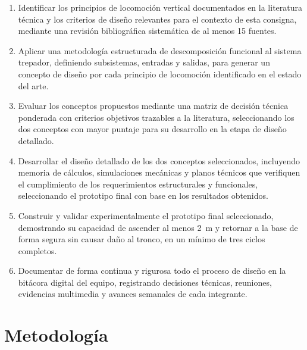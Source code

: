 \documentclass[lettersize,journal]{IEEEtran}
\begin{document}
\begin{enumerate}

    \item Identificar los principios de locomoción vertical documentados en
    la literatura técnica y los criterios de diseño relevantes para el contexto de
    esta consigna, mediante una revisión bibliográfica sistemática de al menos 15
    fuentes.

    \item Aplicar una metodología estructurada de descomposición funcional al
    sistema trepador, definiendo subsistemas, entradas y salidas, para generar un
    concepto de diseño por cada principio de locomoción identificado en el estado del
    arte.

    \item Evaluar los conceptos propuestos mediante una matriz de decisión
    técnica ponderada con criterios objetivos trazables a la literatura, seleccionando
    los dos conceptos con mayor puntaje para su desarrollo en la etapa de diseño
    detallado.

    \item Desarrollar el diseño detallado de los dos conceptos seleccionados,
    incluyendo memoria de cálculos, simulaciones mecánicas y planos técnicos que
    verifiquen el cumplimiento de los requerimientos estructurales y funcionales,
    seleccionando el prototipo final con base en los resultados obtenidos.

    \item Construir y validar experimentalmente el prototipo final
    seleccionado, demostrando su capacidad de ascender al menos \SI{2}{\meter} y
    retornar a la base de forma segura sin causar daño al tronco, en un mínimo de
    tres ciclos completos.

    \item Documentar de forma continua y rigurosa todo el proceso de diseño
    en la bitácora digital del equipo, registrando decisiones técnicas, reuniones,
    evidencias multimedia y avances semanales de cada integrante.

\end{enumerate}


\section{\textbf{Metodología}}
\label{sec:metodologia}
\end{document}
